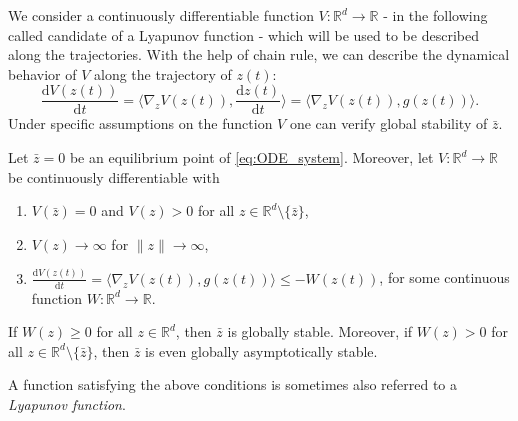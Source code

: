 \documentclass[12pt,openany]{book}
\theoremstyle{definition}
\theoremstyle{definition}
\newcommand{\R}{\mathbb{R}}
\newcommand{\dd}{{\mathrm{d}}}
\begin{document}
We consider a continuously differentiable function $V:\R^d\to\R$ - in the following called candidate of a Lyapunov function - which will be used to be described along the trajectories.  With the help of chain rule, we can describe the dynamical behavior of $V$ along the trajectory of $z(t)$: 
\[\frac{\dd V(z(t))}{\dd t} =\langle \nabla_z V(z(t)), \frac{\dd z(t)}{\dd t}\rangle = \langle \nabla_z V(z(t)), g(z(t))\rangle. \]
Under specific assumptions on the function $V$ one can verify global stability of $\bar z$.
\begin{thm}\label{thm:Lyapunov}
Let $\bar z=0$ be an equilibrium point  of \eqref{eq:ODE_system}. Moreover, let $V:\R^d\to\R$ be continuously differentiable with
\begin{enumerate}
\item $V(\bar z) =0$ and $V(z)>0$ for all $z\in\R^d\setminus \{\bar z\}$,
\item $V(z) \to\infty$ for $\|z\|\to\infty$,
\item $\frac{\dd V(z(t))}{\dd t} = \langle \nabla_z V(z(t)), g(z(t))\rangle \le -W(z(t))$, for some continuous function $W:\R^d\to\R$.
\end{enumerate}
If $W(z)\ge0$ for all $z\in\R^d$, then $\bar z$ is globally stable. Moreover, if $W(z)>0$ for all $z\in\R^d\setminus\{\bar z\}$, then $\bar z$ is even globally asymptotically stable. 
\end{thm}
A function satisfying the above conditions is sometimes also referred to a \textit{Lyapunov function}.

\medskip
\end{document}
